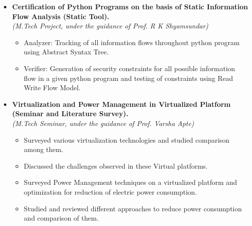 \begin{itemize}
\item \textbf{Certification of Python Programs on the basis of Static Information Flow Analysis (Static Tool).} \\
      \emph{(M.Tech Project, under the guidance of Prof. R K Shyamsundar)}  \\[-0.6cm]
 \begin{itemize}
 \item Analyzer: Tracking of all information flows throughout python program using Abstract Syntax Tree.
 \item Verifier: Generation of security constraints for all possible information flow in a given python program and testing of constraints using Read Write Flow Model.
 \\[-0.5cm]
\end{itemize}
\item \textbf{Virtualization and Power Management in Virtualized Platform (Seminar and Literature Survey).} \\
\emph{(M.Tech Seminar, under the guidance of Prof. Varsha Apte)} \\[-0.6cm]
\begin{itemize}
	\item Surveyed various virtualization technologies and studied comparison among them. \\[-0.5cm]
	\item Discussed the challenges observed in these Virtual platforms. \\[-0.5cm]
	\item Surveyed Power Management techniques on a virtualized platform and optimization for reduction of electric power consumption. \\[-0.5cm]
	\item Studied and reviewed different approaches to reduce power consumption and comparison of them.
\end{itemize}

\end{itemize}
